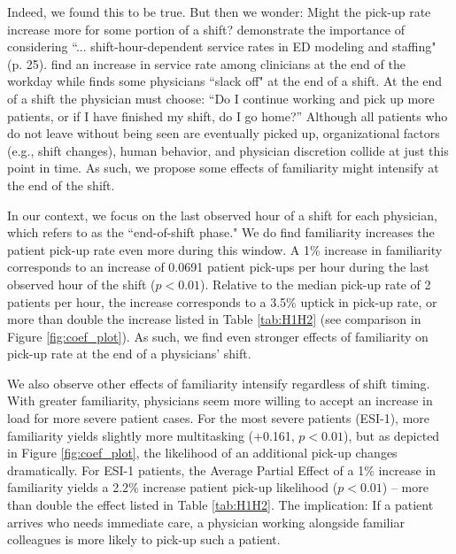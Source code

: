  Indeed, we found this to be true. But then we wonder: Might the pick-up rate increase more for some portion of a shift? \cite{Ouyang2021} demonstrate the importance of considering “... shift-hour-dependent service rates in ED modeling and staffing" (p. 25). \cite{Deo2019} find an increase in service rate among clinicians at the end of the workday while \cite{Chan2018} finds some physicians “slack off" at the end of a shift. At the end of a shift the physician must choose: “Do I continue working and pick up more patients, or if I have finished my shift, do I go home?” Although all patients who do not leave without being seen are eventually picked up, organizational factors (e.g., shift changes), human behavior, and physician discretion collide at just this point in time. As such, we propose some effects of familiarity might intensify at the end of the shift.
 
 In our context, we focus on the last observed hour of a shift for each physician, which \cite{Ouyang2021} refers to as the “end-of-shift phase." We do find familiarity increases the patient pick-up rate even more during this window. A 1\% increase in familiarity corresponds to an increase of 0.0691 patient pick-ups per hour during the last observed hour of the shift ($p < 0.01$). Relative to the median pick-up rate of 2 patients per hour, the increase corresponds to a 3.5\% uptick in pick-up rate, or more than double the increase listed in Table \ref{tab:H1H2} (see comparison in Figure \ref{fig:coef_plot}). As such, we find even stronger effects of familiarity on pick-up rate at the end of a physicians' shift. 
 
 We also observe other effects of familiarity intensify regardless of shift timing. With greater familiarity, physicians seem more willing to accept an increase in load for more severe patient cases. For the most severe patients (ESI-1), more familiarity yields slightly more multitasking (+0.161, $p < 0.01$), but as depicted in Figure \ref{fig:coef_plot}, the likelihood of an additional pick-up changes dramatically. For ESI-1 patients, the Average Partial Effect of a 1\% increase in familiarity yields a 2.2\% increase patient pick-up likelihood ($p < 0.01$) -- more than double the effect listed in Table \ref{tab:H1H2}. The implication: If a patient arrives who needs immediate care, a physician working alongside familiar colleagues is more likely to pick-up such a patient.
 
